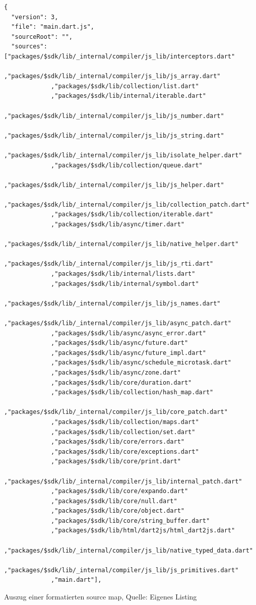 \begin{appendix}
\begin{listing}[htbp]
\begin{verbatim}
{
  "version": 3,
  "file": "main.dart.js",
  "sourceRoot": "",
  "sources": ["packages/$sdk/lib/_internal/compiler/js_lib/interceptors.dart" 
             ,"packages/$sdk/lib/_internal/compiler/js_lib/js_array.dart" 
             ,"packages/$sdk/lib/collection/list.dart" 
             ,"packages/$sdk/lib/internal/iterable.dart" 
             ,"packages/$sdk/lib/_internal/compiler/js_lib/js_number.dart" 
             ,"packages/$sdk/lib/_internal/compiler/js_lib/js_string.dart" 
             ,"packages/$sdk/lib/_internal/compiler/js_lib/isolate_helper.dart" 
             ,"packages/$sdk/lib/collection/queue.dart" 
             ,"packages/$sdk/lib/_internal/compiler/js_lib/js_helper.dart" 
             ,"packages/$sdk/lib/_internal/compiler/js_lib/collection_patch.dart" 
             ,"packages/$sdk/lib/collection/iterable.dart" 
             ,"packages/$sdk/lib/async/timer.dart" 
             ,"packages/$sdk/lib/_internal/compiler/js_lib/native_helper.dart" 
             ,"packages/$sdk/lib/_internal/compiler/js_lib/js_rti.dart" 
             ,"packages/$sdk/lib/internal/lists.dart" 
             ,"packages/$sdk/lib/internal/symbol.dart" 
             ,"packages/$sdk/lib/_internal/compiler/js_lib/js_names.dart" 
             ,"packages/$sdk/lib/_internal/compiler/js_lib/async_patch.dart" 
             ,"packages/$sdk/lib/async/async_error.dart" 
             ,"packages/$sdk/lib/async/future.dart" 
             ,"packages/$sdk/lib/async/future_impl.dart" 
             ,"packages/$sdk/lib/async/schedule_microtask.dart" 
             ,"packages/$sdk/lib/async/zone.dart" 
             ,"packages/$sdk/lib/core/duration.dart" 
             ,"packages/$sdk/lib/collection/hash_map.dart" 
             ,"packages/$sdk/lib/_internal/compiler/js_lib/core_patch.dart" 
             ,"packages/$sdk/lib/collection/maps.dart" 
             ,"packages/$sdk/lib/collection/set.dart" 
             ,"packages/$sdk/lib/core/errors.dart" 
             ,"packages/$sdk/lib/core/exceptions.dart" 
             ,"packages/$sdk/lib/core/print.dart" 
             ,"packages/$sdk/lib/_internal/compiler/js_lib/internal_patch.dart" 
             ,"packages/$sdk/lib/core/expando.dart" 
             ,"packages/$sdk/lib/core/null.dart" 
             ,"packages/$sdk/lib/core/object.dart" 
             ,"packages/$sdk/lib/core/string_buffer.dart" 
             ,"packages/$sdk/lib/html/dart2js/html_dart2js.dart" 
             ,"packages/$sdk/lib/_internal/compiler/js_lib/native_typed_data.dart" 
             ,"packages/$sdk/lib/_internal/compiler/js_lib/js_primitives.dart" 
             ,"main.dart"],
\end{verbatim}
\caption[Auszug einer formatierten source map]{Auszug einer formatierten source map, Quelle: Eigenes Listing}
\label{lst:AuszugEinerFormatiertenSourceMap}
\end{listing}



\end{appendix}
